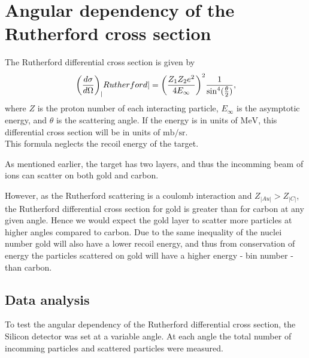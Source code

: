 \section{Angular dependency of the Rutherford cross section}
The Rutherford differential cross section \parencite[p. 16]{noteBB} is given by
\begin{align}\label{eq:cross}
    {\left( \diff[d]{\sigma}{\Omega} \right)}_|Rutherford| =
    {\left(\frac{Z_1Z_2 e^2}{4E_{\infty}} \right)}^2
    \frac{1}{{{\sin}^4(\frac{\theta}{2})}},
\end{align}
where $Z$ is the proton number of each interacting particle, $E_{\infty}$ is
the asymptotic energy, and $\theta$ is the scattering angle. If the energy is
in units of $\si{\mega\electronvolt}$, this differential cross section will be in units
of $\si{\milli\barn\per\steradian}$.\\
This formula neglects the recoil energy of the target. 

As mentioned earlier, the target has two layers, and thus the incomming beam of
ions can scatter on both gold and carbon. 

However, as the Rutherford scattering is a coulomb interaction and $Z_|Au| >
Z_|C|$, the Rutherford differential cross section for gold is greater than for carbon at any given angle. Hence we would expect the gold layer to scatter more particles at higher angles compared to carbon. Due to the same inequality of the nuclei number gold will also have a lower recoil energy, and thus from conservation of energy the particles scattered on gold will have a higher energy - bin number - than carbon.



\subsection{Data analysis}
To test the angular dependency of the Rutherford differential cross section,
the Silicon detector was set at a variable angle. At each angle the total
number of incomming particles and scattered particles were measured.\\

